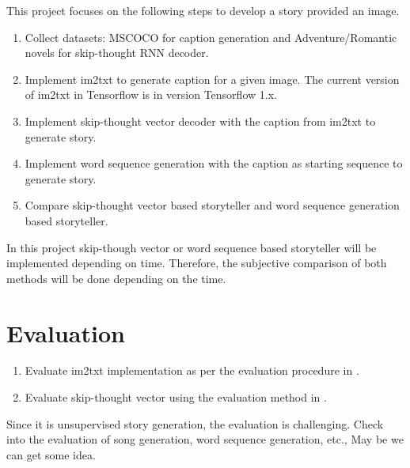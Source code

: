 \documentclass{article}
\begin{document}
This project focuses on the following steps to develop a story provided an image.

\begin{enumerate}
\item Collect datasets: MSCOCO for caption generation and Adventure/Romantic novels for skip-thought RNN decoder.
\item Implement im2txt to generate caption for a given image. The current version of im2txt in Tensorflow is in version Tensorflow 1.x.
\item Implement skip-thought vector decoder with the caption from im2txt to generate story.
\item Implement word sequence generation with the caption as starting sequence to generate story.
\item Compare skip-thought vector based storyteller and word sequence generation based storyteller.
\end{enumerate}

In this project skip-though vector or word sequence based storyteller will be implemented depending on time. Therefore, the subjective comparison of both methods will be done depending on the time. 

\section{Evaluation}

\begin{enumerate}
    \item Evaluate im2txt implementation as per the evaluation procedure in \cite{showandtell}.
    \item Evaluate skip-thought vector using the evaluation method in \cite{skip-thought}.
\end{enumerate}

Since it is unsupervised story generation, the evaluation is challenging. Check into the evaluation of song generation, word sequence generation, etc., May be we can get some idea.
\printbibliography
\end{document}

